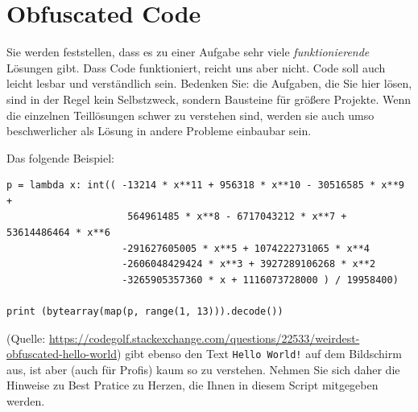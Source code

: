 \section{Obfuscated Code}
Sie werden feststellen, dass es zu einer Aufgabe sehr viele \emph{funktionierende} Lösungen gibt. Dass Code funktioniert, reicht uns aber nicht. Code soll auch leicht lesbar und verständlich sein. Bedenken Sie: die Aufgaben, die Sie hier lösen, sind in der Regel kein Selbstzweck, sondern Bausteine für größere Projekte. Wenn die einzelnen Teillösungen schwer zu verstehen sind, werden sie auch umso beschwerlicher als Lösung in andere Probleme einbaubar sein.

Das folgende Beispiel:
\begin{codebox}
\begin{verbatim}
p = lambda x: int(( -13214 * x**11 + 956318 * x**10 - 30516585 * x**9 + 
                     564961485 * x**8 - 6717043212 * x**7 + 53614486464 * x**6 
                    -291627605005 * x**5 + 1074222731065 * x**4 
                    -2606048429424 * x**3 + 3927289106268 * x**2
                    -3265905357360 * x + 1116073728000 ) / 19958400)

print (bytearray(map(p, range(1, 13))).decode())
\end{verbatim}
\end{codebox}
(Quelle: \url{https://codegolf.stackexchange.com/questions/22533/weirdest-obfuscated-hello-world})
gibt ebenso den Text \texttt{Hello World!} auf dem Bildschirm aus, ist aber (auch für Profis) kaum so zu verstehen. Nehmen Sie sich daher die Hinweise zu Best Pratice zu Herzen, die Ihnen in diesem Script mitgegeben werden.